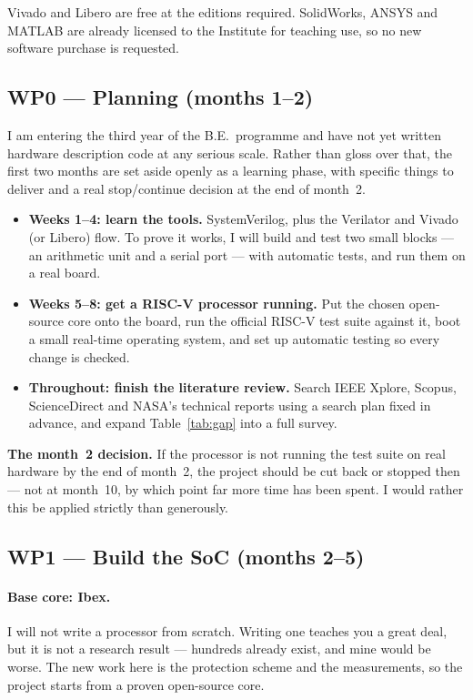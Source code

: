 \documentclass[11pt,a4paper]{article}
\begin{document}
Vivado and Libero are free at the editions required. SolidWorks, ANSYS and MATLAB
are already licensed to the Institute for teaching use, so no new software
purchase is requested.

\subsection{WP0 --- Planning (months 1--2)}
\label{sec:prep}

I am entering the third year of the B.E.\ programme and have not yet written
hardware description code at any serious scale. Rather than gloss over that, the
first two months are set aside openly as a learning phase, with specific things to
deliver and a real stop/continue decision at the end of month~2.

\begin{itemize}
  \item \textbf{Weeks 1--4: learn the tools.} SystemVerilog, plus the Verilator
        and Vivado (or Libero) flow. To prove it works, I will build and test two
        small blocks --- an arithmetic unit and a serial port --- with automatic
        tests, and run them on a real board.
  \item \textbf{Weeks 5--8: get a RISC-V processor running.} Put the chosen
        open-source core onto the board, run the official RISC-V test suite
        against it, boot a small real-time operating system, and set up automatic
        testing so every change is checked.
  \item \textbf{Throughout: finish the literature review.} Search IEEE Xplore,
        Scopus, ScienceDirect and NASA's technical reports using a search plan
        fixed in advance, and expand Table~\ref{tab:gap} into a full survey.
\end{itemize}

\textbf{The month~2 decision.} If the processor is not running the test suite on
real hardware by the end of month~2, the project should be cut back or stopped
then --- not at month~10, by which point far more time has been spent. I would
rather this be applied strictly than generously.

\subsection{WP1 --- Build the SoC (months 2--5)}

\paragraph{Base core: Ibex.}
I will not write a processor from scratch. Writing one teaches you a great deal,
but it is not a research result --- hundreds already exist, and mine would be
worse. The new work here is the protection scheme and the measurements, so the
project starts from a proven open-source core.
\end{document}
